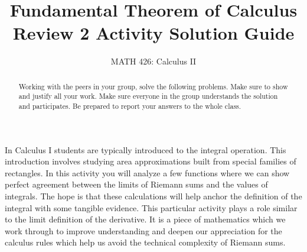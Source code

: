 \documentclass{ximera}
\title{Fundamental Theorem of Calculus Review 2 Activity Solution Guide}
\author{MATH 426: Calculus II}
\begin{document}
\begin{abstract}
   Working with the peers in your group, solve the following problems. Make sure to show and justify all your work. Make sure everyone in the group understands the solution and participates. Be prepared to report your answers to the whole class. 
\end{abstract}
\maketitle


In Calculus I students are typically introduced to the integral operation. This introduction involves studying area approximations built from special families of rectangles. In this activity you will analyze a few functions where we can show perfect agreement between the limits of Riemann sums and the values of integrals. The hope is that these calculations will help anchor the definition of the integral with some tangible evidence. This particular activity plays a role similar to the limit definition of the derivative. It is a piece of mathematics which we work through to improve understanding and deepen our appreciation for the calculus rules which help us avoid the technical complexity of Riemann sums.

\end{document}
